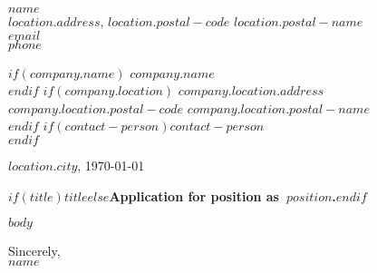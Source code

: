 \documentclass[11pt]{$documentclass$}
\def\thetitle{Søknad om stilling som}
\def\sign{Hilsen}
\def\thetitle{Application for position as}
\def\sign{Sincerely}
\begin{document}
{\selectfont\thispagestyle{empty}
$name$\\
$location.address$, $location.postal-code$ $location.postal-name$\\
\href{mailto:$email$}{$email$}\\
$phone$

$if(company.name)$
$company.name$\\
$endif$
$if(company.location)$
$company.location.address$\\
$company.location.postal-code$ $company.location.postal-name$\\
$endif$
$if(contact-person)$$contact-person$\\
$endif$

\hfill $location.city$, \today

\vspace{1em}
{\Large\textbf{$if(title)$$title$$else$\thetitle\ $position$.$endif$}}

$body$

\vspace{2em}
\sign,\\
$name$

}
\end{document}
